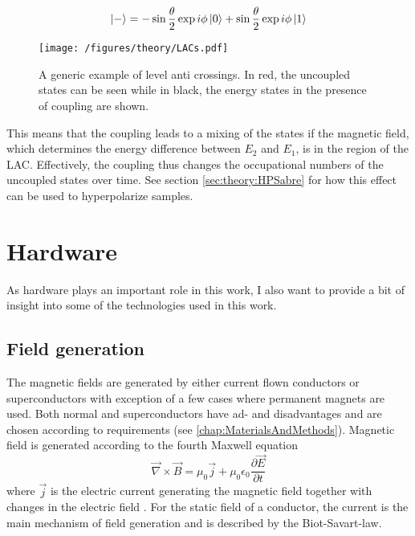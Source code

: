         \begin{equation*}
            \ket{-} = -\sin{\frac{\theta}{2}}\exp{i\phi}\ket{0} + \sin{\frac{\theta}{2}}\exp{i\phi}\ket{1}
        \end{equation*}
            \begin{figure}
                \centering
                \texttt{[image: /figures/theory/LACs.pdf]}
                \caption[Level anti crossings]{A generic example of level anti crossings. In red, the uncoupled states can be seen while in black, the energy states in the presence of coupling are shown.}
                \label{figure:theory:LAC}
            \end{figure}
            This means that the coupling leads to a mixing of the states if the magnetic field, which determines the energy difference between $E_2$ and $E_1$, is in the region of the LAC. Effectively, the coupling thus changes the occupational numbers of the uncoupled states over time. See section \ref{sec:theory:HPSabre} for how this effect can be used to hyperpolarize samples.
        \section{Hardware}
            As hardware plays an important role in this work, I also want to provide a bit of insight into some of the technologies used in this work.
            \subsection{Field generation}
                The magnetic fields are generated by either current flown conductors or superconductors with exception of a few cases where permanent magnets are used. Both normal and superconductors have ad- and disadvantages and are chosen according to requirements (see \ref{chap:MaterialsAndMethods}). Magnetic field is generated according to the fourth Maxwell equation
                \begin{equation}
                    \label{equation:theory:maxwell}
                    \vec\nabla\times\vec B = \mu_0\vec j+\mu_0\epsilon_0\frac{\partial\vec E}{\partial t}
                \end{equation}
                where $\vec j$ is the electric current generating the magnetic field together with changes in the electric field \cite{b.i._bleaney__b._bleaney_electricity_nodate}. For the static field of a conductor, the current is the main mechanism of field generation and is described by the Biot-Savart-law.
